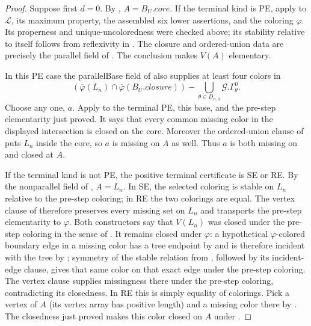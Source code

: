 \begin{proof}
Suppose first $d=0$. By , $A=B_U.\mathit{core}$.
If the terminal kind is PE, apply
 to $\mathcal L$, its maximum
property, the assembled six lower assertions, and the coloring $\varphi$.
Its properness and unique-uncoloredness were checked above; its stability
relative to itself follows from reflexivity in .
The closure and ordered-union data are precisely the parallel field of
. The conclusion makes $V(A)$ elementary.

In this PE case the parallelBase field of 
also supplies at least four colors in
\[
 (\overline\varphi(L_n)\cap\overline\varphi(B_U.\mathit{closure}))
  -\bigcup_{\theta\in D_{n,0}}\mathcal G.\Gamma^0_\theta.
\]
Choose any one, $a$. Apply  to
the terminal PE, this base, and the pre-step elementarity just proved.
It says that every common missing color in the displayed intersection
is closed on the core. Moreover the ordered-union clause of
 puts $L_n$ inside the core, so $a$ is missing
on $A$ as well. Thus $a$ is both missing on and closed at $A$.

If the terminal kind is not PE, the positive terminal certificate is
SE or RE. By the nonparallel field of ,
$A=L_n$. In SE, the selected coloring is stable on $L_n$ relative to
the pre-step coloring; in RE the two colorings are equal. The vertex
clause of  therefore preserves every missing
set on $L_n$ and transports the pre-step elementarity to $\varphi$.
Both constructors say that $V(L_n)$ was closed under the pre-step
coloring in the sense of . It remains
closed under $\varphi$: a hypothetical $\varphi$-colored boundary
edge in a missing color has a tree endpoint by 
and is therefore incident with the tree by ;
symmetry of the stable
relation from , followed by its incident-edge clause,
gives that same color on that exact edge under the pre-step coloring.
The vertex clause supplies missingness there under the pre-step
coloring, contradicting its closedness. In RE this is simply equality
of colorings. Pick a vertex of $A$ (its vertex array has positive
length) and a missing color there by
. The closedness just
proved makes this color closed on $A$ under .


\end{proof}
